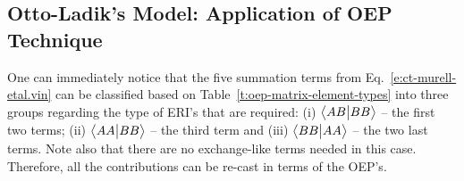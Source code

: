 \documentclass[aip,jcp,amsmath,amssymb,reprint,floatfix]{revtex4-1}
\begin{document}
\subsection{\label{ss:3.3.OEP} Otto-Ladik's Model: Application of OEP Technique}

One can immediately notice that the five summation terms
from Eq.~\eqref{e:ct-murell-etal.vin} can be classified 
based on Table~\ref{t:oep-matrix-element-types} 
into three groups
regarding the type of ERI's that are required:
(i) $\bigl\langle {AB} \bigl\lvert {BB} \bigr\rangle$ -- the first two terms;
(ii) $\bigl\langle {AA} \bigl\lvert {BB} \bigr\rangle$ -- the third term and
(iii) $\bigl\langle {BB} \bigl\lvert {AA} \bigr\rangle$ -- the two last terms. 
Note also that there are no exchange\hyp{}like terms needed in this case.
Therefore, all the contributions can be re\hyp{}cast in terms of the OEP's.
\end{document}
